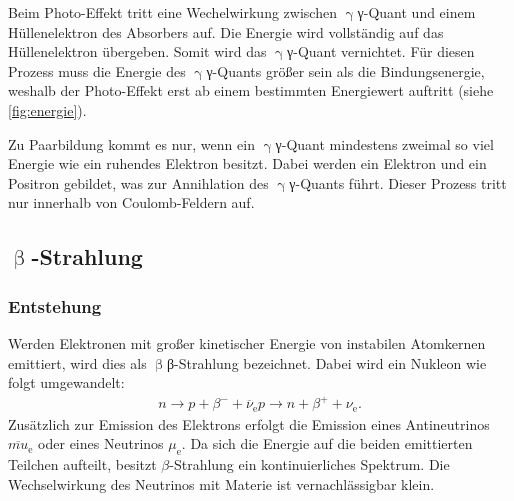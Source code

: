 Beim Photo-Effekt tritt eine Wechelwirkung zwischen $\upgamma${γ}-Quant und einem Hüllenelektron des Absorbers auf. Die Energie wird vollständig auf das Hüllenelektron übergeben. Somit wird das $\upgamma${γ}-Quant vernichtet. Für diesen Prozess muss die Energie des $\upgamma${γ}-Quants größer sein als die Bindungsenergie, weshalb der Photo-Effekt erst ab einem bestimmten Energiewert auftritt (siehe \ref{fig:energie}).

Zu Paarbildung kommt es nur, wenn ein $\upgamma${γ}-Quant mindestens zweimal so viel Energie wie ein ruhendes Elektron besitzt. Dabei werden ein Elektron und ein Positron gebildet, was zur Annihlation des $\upgamma${γ}-Quants führt. Dieser Prozess tritt nur innerhalb von Coulomb-Feldern auf.


\subsection{\texorpdfstring{$\upbeta$}{β}-Strahlung}
\subsubsection{Entstehung}
Werden Elektronen mit großer kinetischer Energie von instabilen Atomkernen emittiert, wird dies als $\upbeta${β}-Strahlung bezeichnet. Dabei wird ein Nukleon wie folgt umgewandelt:
\begin{align}
  n \rightarrow p + \beta^- + \overline{\nu}_\mathrm{e}
  p \rightarrow n + \beta^+ +\nu_\mathrm{e}.
\end{align}
Zusätzlich zur Emission des Elektrons erfolgt die Emission eines Antineutrinos $\overline{mu}_\mathrm{e}$ oder eines Neutrinos $\mu_\mathrm{e}$. Da sich die Energie auf die beiden emittierten Teilchen aufteilt, besitzt $\beta$-Strahlung ein kontinuierliches Spektrum. Die Wechselwirkung des Neutrinos mit Materie ist vernachlässigbar klein.

